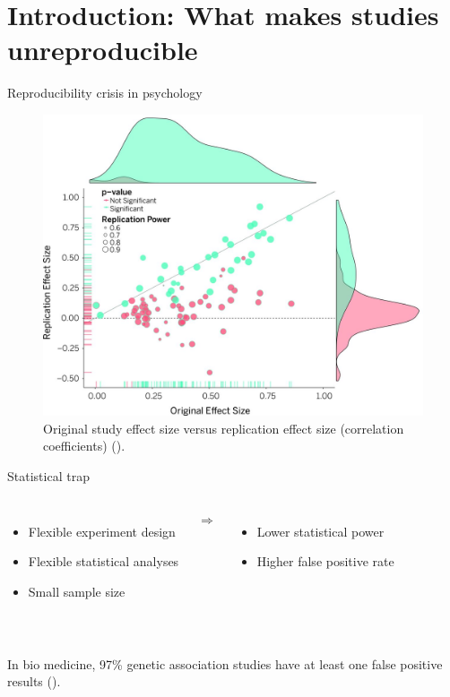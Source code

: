 \documentclass{beamer}
\begin{document}
    \section{Introduction: What makes studies unreproducible}
    \begin{frame}{Reproducibility crisis in psychology}
    	\begin{figure}[H]
    		\centering
    		\includegraphics[width=.8\textwidth]{pics/effect size.jpeg}
    		\caption{Original study effect size versus replication effect size (correlation coefficients) (\cite{opensciencecollaboration2015}).}
    	\end{figure}
    \end{frame}

    \begin{frame}{Statistical trap}
    	\begin{columns}
    	\begin{itemize}
   		  \item Flexible experiment design
          \item Flexible statistical analyses
          \item Small sample size
      	\end{itemize}
			$\Longrightarrow$
            \begin{itemize}
            	\item Lower statistical power
            	\item Higher false positive rate
            \end{itemize}
        \end{columns}
        
       ~\\In bio medicine, 97\% genetic association studies have at least one false positive results (\cite{sullivan2007}). 
    \end{frame}
    
\end{document}
